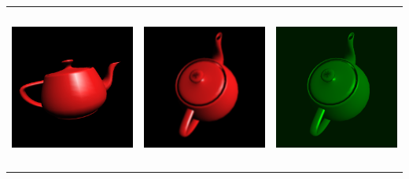 \documentclass[12pt,a4paper,titlepage,final]{report}
\begin{document}
\begin{center}
\begin{tabular}{lcr}
	\includegraphics[height=53mm]{images/bezefektu.png} &		
	\includegraphics[height=53mm]{images/rozmazani.png} &
	\includegraphics[height=53mm]{images/nightvision.png} \\
	

\end{tabular}
\end{center}
\end{document}
